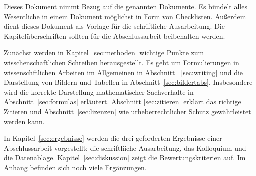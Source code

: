 Dieses Dokument nimmt Bezug auf die genannten Dokumente. Es bündelt alles Wesentliche in einem Dokument möglichst in Form von Checklisten. Außerdem dient dieses Dokument als Vorlage für die schriftliche Ausarbeitung.
Die Kapitelüberschriften sollten für die Abschlussarbeit beibehalten werden.

Zunächst werden in  Kapitel~\ref{sec:methoden}  wichtige Punkte zum wisschenschaftlichen Schreiben herausgestellt. Es geht um Formulierungen in wissenschftlichen Arbeiten im Allgemeinen in Abschnitt~ \ref{sec:writing} und die Darstellung von Bildern und Tabellen in Abschnitt~\ref{sec:bildertabs}. Insbesondere wird die korrekte Darstellung mathematischer Sachverhalte in Abschnitt~\ref{sec:formulas} erläutert. Abschnitt \ref{sec:zitieren} erklärt das richtige Zitieren und Abschnitt~\ref{sec:lizenzen} wie urheberrechtlicher Schutz gewährleistet werden kann.
%
%
%
%

In Kapitel~\ref{sec:ergebnisse} werden die drei geforderten Ergebnisse einer Abschlussarbeit vorgestellt: die schriftliiche Ausarbeitung, das Kolloquium und die Datenablage.
Kapitel~\ref{sec:diskussion} zeigt die Bewertungskriterien auf.
Im Anhang befinden sich noch viele Ergänzungen. 















